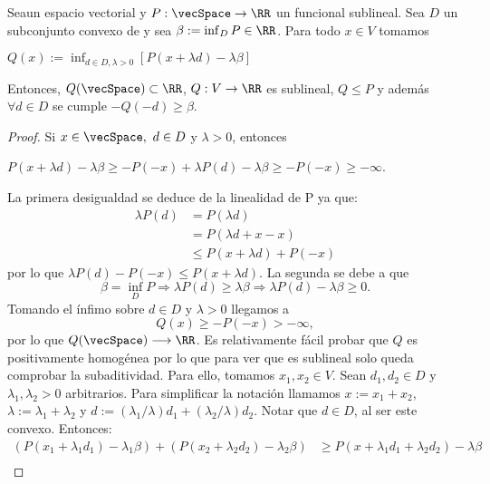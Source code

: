 \bigskip 
	\begin{lemaBox}\label{lema2}
		Sea\vecSpace un espacio vectorial y $P:\vecSpace \rightarrow \RR$ un funcional sublineal. Sea $ D $ un subconjunto convexo de \vecSpace y sea $ \beta := \inf_D P \in \RR $. Para todo $ x \in V $ tomamos  
		\begin{center}
			$ Q(x) := \inf_{d \in D, \lambda > 0} \left[P(x+\lambda d) - \lambda \beta\right] $
		\end{center}
		
		Entonces, $ Q(\vecSpace) \subset \RR $, $ Q:V \rightarrow \RR$ es sublineal, $ Q \leq P $ y además $ \forall d \in D$ se cumple  $-Q(-d) \geq \beta$.
	\end{lemaBox} 
	\begin{proof}
		Si $ x \in \vecSpace,\text{ }d \in D $ y $ \lambda > 0 $, entonces
		\begin{center}
			$ P(x+ \lambda d) - \lambda \beta \geq -P(-x) + \lambda P(d)-\lambda\beta \geq -P(-x) \geq -\infty$.
		\end{center}
		La primera desigualdad se deduce de la linealidad de P ya que:
		\begin{equation*}
		\begin{split}
		\lambda P(d) &= P(\lambda d) \\ 
		&=P(\lambda d +x-x) \\ 
		&\leq P(x+\lambda d)+ P(-x)
		\end{split}
		\end{equation*}
		por lo que $ \lambda P(d)-P(-x) \leq P(x+\lambda d) $. La segunda se debe a que
		\[\beta = \inf_D P \Longrightarrow \lambda P(d) \geq \lambda\beta \Longrightarrow\lambda P(d) - \lambda\beta \geq 0. \]
		Tomando el ínfimo sobre $ d \in D  $ y $ \lambda > 0 $ llegamos a \[ Q(x)\geq -P(-x) > -\infty,\] por lo que $ Q(\vecSpace) \longrightarrow \RR$. Es relativamente fácil probar que $ Q $ es positivamente homogénea por lo que para ver que es sublineal solo queda comprobar la subaditividad. Para ello, tomamos $ x_1, x_2 \in V $. Sean $ d_1, d_2 \in D $ y $ \lambda_1, \lambda_2 > 0$ arbitrarios. Para simplificar la notación llamamos $ x := x_1 + x_2 $, $ \lambda := \lambda_1 + \lambda_2 $ y $ d:= (\lambda_1/\lambda)d_1 + (\lambda_2/\lambda)d_2 $. Notar que $ d \in D $, al ser este convexo. Entonces: 
		\begin{equation*}
		\begin{split}
		( P(x_1 + \lambda_1 d_1) - \lambda_1 \beta ) + ( P(x_2 + \lambda_2 d_2) - \lambda_2 \beta ) &\geq P(x + \lambda_1 d_1 + \lambda_2 d_2) - \lambda \beta\\

\end{split}
\end{equation*}
\end{proof}
